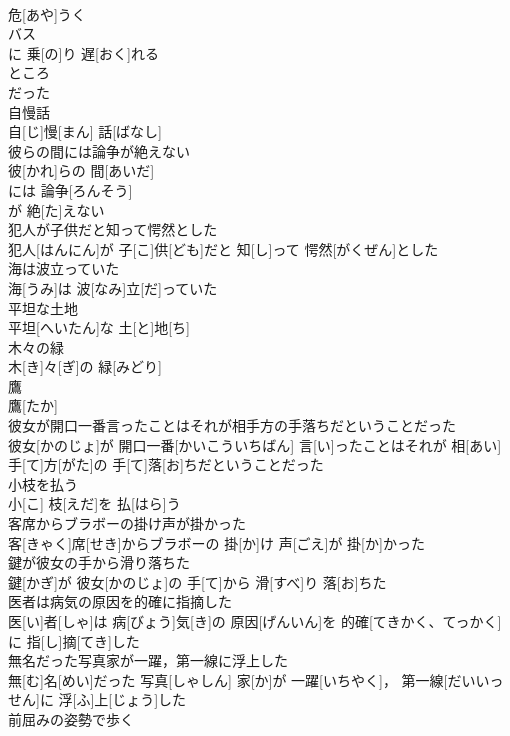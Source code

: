 \documentclass[8pt]{extreport}
\begin{document}
\begin{CJK}{UTF8}{min}
\\	危[あや]うく 
\\	バス 
\\	に 乗[の]り 遅[おく]れる 
\\	ところ 
\\	だった
\\	自慢話	
\\	自[じ]慢[まん] 話[ばなし]
\\	彼らの間には論争が絶えない	
\\	彼[かれ]らの 間[あいだ]
\\	には 論争[ろんそう]
\\	が 絶[た]えない 
\\	犯人が子供だと知って愕然とした	
\\	犯人[はんにん]が 子[こ]供[ども]だと 知[し]って 愕然[がくぜん]とした
\\	海は波立っていた	
\\	海[うみ]は 波[なみ]立[だ]っていた
\\	平坦な土地	
\\	平坦[へいたん]な 土[と]地[ち]
\\	木々の緑	
\\	木[き]々[ぎ]の 緑[みどり]
\\	鷹	
\\	鷹[たか]
\\	彼女が開口一番言ったことはそれが相手方の手落ちだということだった	
\\	彼女[かのじょ]が 開口一番[かいこういちばん] 言[い]ったことはそれが 相[あい]手[て]方[がた]の 手[て]落[お]ちだということだった
\\	小枝を払う	
\\	小[こ] 枝[えだ]を 払[はら]う
\\	客席からブラボーの掛け声が掛かった	
\\	客[きゃく]席[せき]からブラボーの 掛[か]け 声[ごえ]が 掛[か]かった
\\	鍵が彼女の手から滑り落ちた	
\\	鍵[かぎ]が 彼女[かのじょ]の 手[て]から 滑[すべ]り 落[お]ちた
\\	医者は病気の原因を的確に指摘した	
\\	医[い]者[しゃ]は 病[びょう]気[き]の 原因[げんいん]を 的確[てきかく、てっかく]に 指[し]摘[てき]した
\\	無名だった写真家が一躍，第一線に浮上した	
\\	無[む]名[めい]だった 写真[しゃしん] 家[か]が 一躍[いちやく]， 第一線[だいいっせん]に 浮[ふ]上[じょう]した
\\	前屈みの姿勢で歩く	

\end{CJK}
\end{document}
